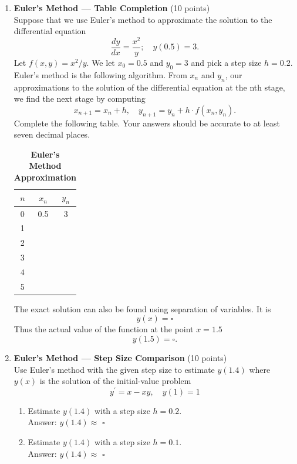 \begin{enumerate}
  \item \textbf{Euler's Method --- Table Completion} (10 points)\\
  Suppose that we use Euler's method to approximate the solution to the differential equation
  $$
  \frac{d y}{d x}=\frac{x^2}{y} ; \quad y(0.5)=3 .
  $$
  Let $f(x, y)=x^2 / y$.
  We let $x_0=0.5$ and $y_0=3$ and pick a step size $h=0.2$. Euler's method is the following algorithm. From $x_n$ and $y_n$, our approximations to the solution of the differential equation at the nth stage, we find the next stage by computing
  $$
  x_{n+1}=x_n+h, \quad y_{n+1}=y_n+h \cdot f\left(x_n, y_n\right) .
  $$
  Complete the following table. Your answers should be accurate to at least seven decimal places.
  \begin{table}[h!]
  \centering
  \renewcommand{\arraystretch}{1.3}
  \setlength{\tabcolsep}{12pt}
  \caption*{\textbf{Euler's Method Approximation}}
  \begin{tabular}{|c|c|c|}
  \hline
  \rowcolor[HTML]{E0E0E0}
  $n$ & $x_n$ & $y_n$ \\
  \hline 0 & 0.5 & 3 \\
  \hline 1 & & \\
  \hline 2 & & \\
  \hline 3 & & \\
  \hline 4 & & \\
  \hline 5 & & \\
  \hline
  \end{tabular}
  \end{table}
  \begin{subanswer}
  \end{subanswer}
  The exact solution can also be found using separation of variables. It is
  $$
  y(x)=\square
  $$
  Thus the actual value of the function at the point $x=1.5$
  $$
  y(1.5)=\square .
  $$
  \begin{subanswer}
  \end{subanswer}

  \item \textbf{Euler's Method --- Step Size Comparison} (10 points)\\
  Use Euler's method with the given step size to estimate $y(1.4)$ where $y(x)$ is the solution of the initial-value problem
  $$
  y^{\prime}=x-x y, \quad y(1)=1
  $$
  \begin{enumerate}[label=\arabic*.]
    \item Estimate $y(1.4)$ with a step size $h=0.2$.\\
    Answer: $y(1.4) \approx$ $\square$\\
    \begin{subanswer}
    \end{subanswer}
    \item Estimate $y(1.4)$ with a step size $h=0.1$.\\
    Answer: $y(1.4) \approx$ $\square$\\
    \begin{subanswer}
    \end{subanswer}
  \end{enumerate}


\end{enumerate}
